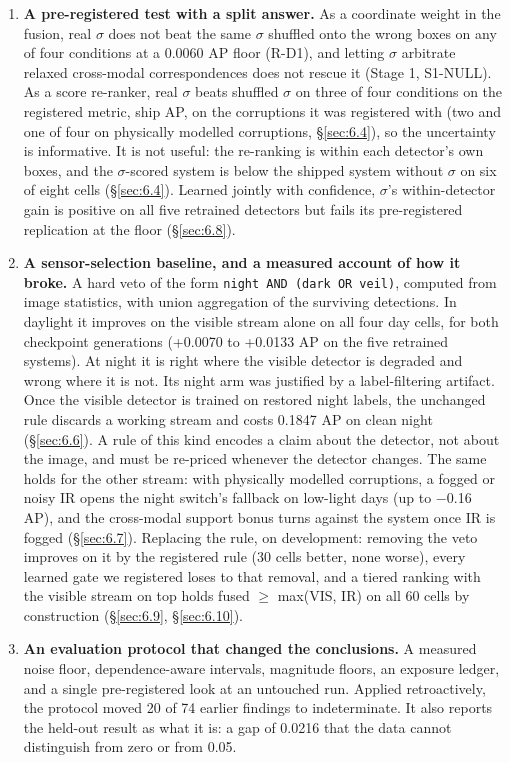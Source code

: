 \documentclass[10pt]{article}
\begin{document}
\begin{enumerate}
\item \textbf{A pre-registered test with a split answer.} As a coordinate weight in the fusion, real $\sigma$ does not beat the same $\sigma$ shuffled onto the wrong boxes on any of four conditions at a 0.0060 AP floor (R-D1), and letting $\sigma$ arbitrate relaxed cross-modal correspondences does not rescue it (Stage 1, S1-NULL). As a score re-ranker, real $\sigma$ beats shuffled $\sigma$ on three of four conditions on the registered metric, ship AP, on the corruptions it was registered with (two and one of four on physically modelled corruptions, \S\ref{sec:6.4}), so the uncertainty is informative. It is not useful: the re-ranking is within each detector's own boxes, and the $\sigma$-scored system is below the shipped system without $\sigma$ on six of eight cells (\S\ref{sec:6.4}). Learned jointly with confidence, $\sigma$'s within-detector gain is positive on all five retrained detectors but fails its pre-registered replication at the floor (\S\ref{sec:6.8}).
\item \textbf{A sensor-selection baseline, and a measured account of how it broke.} A hard veto of the form \texttt{night AND (dark OR veil)}, computed from image statistics, with union aggregation of the surviving detections. In daylight it improves on the visible stream alone on all four day cells, for both checkpoint generations (+0.0070 to +0.0133 AP on the five retrained systems). At night it is right where the visible detector is degraded and wrong where it is not. Its night arm was justified by a label-filtering artifact. Once the visible detector is trained on restored night labels, the unchanged rule discards a working stream and costs 0.1847 AP on clean night (\S\ref{sec:6.6}). A rule of this kind encodes a claim about the detector, not about the image, and must be re-priced whenever the detector changes. The same holds for the other stream: with physically modelled corruptions, a fogged or noisy IR opens the night switch's fallback on low-light days (up to $-$0.16 AP), and the cross-modal support bonus turns against the system once IR is fogged (\S\ref{sec:6.7}). Replacing the rule, on development: removing the veto improves on it by the registered rule (30 cells better, none worse), every learned gate we registered loses to that removal, and a tiered ranking with the visible stream on top holds fused $\geq$ max(VIS, IR) on all 60 cells by construction (\S\ref{sec:6.9}, \S\ref{sec:6.10}).
\item \textbf{An evaluation protocol that changed the conclusions.} A measured noise floor, dependence-aware intervals, magnitude floors, an exposure ledger, and a single pre-registered look at an untouched run. Applied retroactively, the protocol moved 20 of 74 earlier findings to indeterminate. It also reports the held-out result as what it is: a gap of 0.0216 that the data cannot distinguish from zero or from 0.05.
\end{enumerate}
\end{document}
